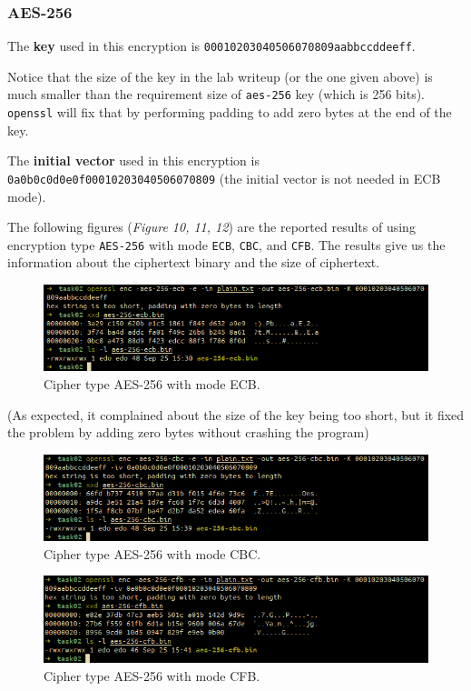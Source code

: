 \documentclass{article}
\begin{document}
\subsubsection{AES-256}

The \textbf{key} used in this encryption is \texttt{00010203040506070809aabbccddeeff}.

Notice that the size of the key in the lab writeup (or the one given above) is
much smaller than the requirement size of \texttt{aes-256} key (which is 256 bits).
\texttt{openssl} will fix that by performing padding to add zero bytes at the
end of the key.

The \textbf{initial vector} used in this encryption is \texttt{0a0b0c0d0e0f00010203040506070809}
(the initial vector is not needed in ECB mode).

The following figures (\textit{Figure 10, 11, 12}) are the reported results of using
encryption type \texttt{AES-256} with mode \texttt{ECB}, \texttt{CBC}, and \texttt{CFB}.
The results give us the information about the ciphertext binary and the size of
ciphertext.

\begin{figure}[!ht]
    \centering
    \includegraphics[scale=0.68]{task02_8.png}
    \caption{Cipher type AES-256 with mode ECB.}
\end{figure}

(As expected, it complained about the size of the key being too short, but it
fixed the problem by adding zero bytes without crashing the program)

\begin{figure}[!ht]
    \centering
    \includegraphics[scale=0.68]{task02_10.png}
    \caption{Cipher type AES-256 with mode CBC.}
\end{figure}

\begin{figure}[!ht]
    \centering
    \includegraphics[scale=0.68]{task02_11.png}
    \caption{Cipher type AES-256 with mode CFB.}
\end{figure}
\end{document}
